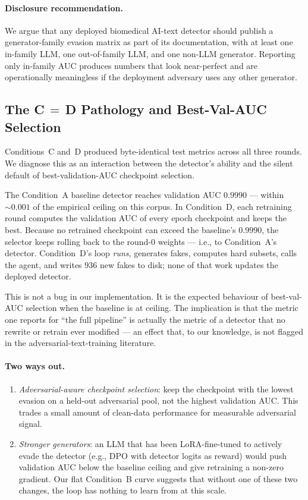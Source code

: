 \paragraph{Disclosure recommendation.}
We argue that any deployed biomedical AI-text detector should publish a
generator-family evasion matrix as part of its documentation, with at
least one in-family LLM, one out-of-family LLM, and one non-LLM
generator. Reporting only in-family AUC produces numbers that look
near-perfect and are operationally meaningless if the deployment
adversary uses any other generator.

\subsection{The C\,$=$\,D Pathology and Best-Val-AUC Selection}
\label{ssec:cd_path}

Conditions~C and~D produced byte-identical test metrics across all three
rounds. We diagnose this as an interaction between the detector's
ability and the silent default of best-validation-AUC checkpoint
selection.

The Condition~A baseline detector reaches validation AUC \(0.9990\) —
within \(\sim 0.001\) of the empirical ceiling on this corpus. In
Condition~D, each retraining round computes the validation AUC of
every epoch checkpoint and keeps the best. Because no retrained
checkpoint can exceed the baseline's \(0.9990\), the selector keeps
rolling back to the round-0 weights — i.e., to Condition~A's
detector. Condition~D's loop \emph{runs}, generates fakes, computes
hard subsets, calls the agent, and writes \(936\) new fakes to disk;
none of that work updates the deployed detector.

This is not a bug in our implementation. It is the expected behaviour
of best-val-AUC selection when the baseline is at ceiling. The
implication is that the metric one reports for ``the full pipeline''
is actually the metric of a detector that no rewrite or retrain ever
modified — an effect that, to our knowledge, is not flagged in the
adversarial-text-training literature.

\paragraph{Two ways out.}
\begin{enumerate}[leftmargin=*]
\item \emph{Adversarial-aware checkpoint selection}: keep the checkpoint
  with the lowest evasion on a held-out adversarial pool, not the
  highest validation AUC. This trades a small amount of clean-data
  performance for measurable adversarial signal.
\item \emph{Stronger generators}: an LLM that has been LoRA-fine-tuned
  to actively evade the detector (e.g., DPO with detector logits as
  reward) would push validation AUC below the baseline ceiling and
  give retraining a non-zero gradient. Our flat
  Condition~B curve suggests that without one of these two changes,
  the loop has nothing to learn from at this scale.
\end{enumerate}

